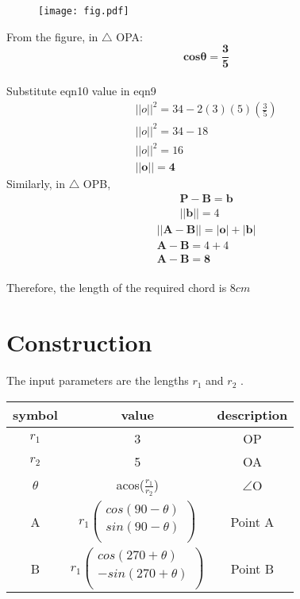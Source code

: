 \documentclass[journal,10pt,twocolumn]{article}
\begin{document}
\begin{figure}[h]
\texttt{[image: fig.pdf]}
\end{figure}
 From the figure, in $\triangle$ OPA:
\begin{equation}
\boldsymbol{cos\theta} = \boldsymbol{\frac{3}{5}}
\end{equation}
\\ Substitute eqn10 value in eqn9
\begin{eqnarray}
||o||^2 = 34 - 2(3)(5)(\frac{3}{5})
\\ ||o||^2 = 34-18
\\ ||o||^2 = 16
\\ \boldsymbol{||o||} =\boldsymbol{4}
\end{eqnarray}
Similarly, in $\triangle$ OPB,
\begin{eqnarray}
	\boldsymbol{P}-\boldsymbol{B} = \boldsymbol{b}
\\	||\boldsymbol{b}|| = 4
\end{eqnarray}
\begin{eqnarray}
	||\boldsymbol{A-B}|| =|\boldsymbol{o}|+|\boldsymbol{b}|
	\\ \boldsymbol{A-B} = 4+4
	\\ \boldsymbol{A-B} = \boldsymbol{8}
\end{eqnarray}
\\ Therefore, the length of the required chord is $8cm$

\section*{Construction}
The input parameters are the lengths $r_1$ and $r_2$ .\\
\setlength \extrarowheight{2pt}
\centering
	\begin{tabular}{|c|c|c|}
	\hline
	\textbf{symbol}&\textbf{value}&\textbf{description}\\
	\hline
	$r_1$&3&OP\\
	\hline
	$r_2$&5&OA\\
	\hline
		$\theta$&acos($\frac{r_1}{r_2}$)&$\angle$O\\
	\hline
	A&$r_1%
	\begin{pmatrix}
		cos(90 -\theta)\\
		sin(90 -\theta)\\
	\end{pmatrix}$%
	&Point A\\
		\hline
	B&$r_1%
		\begin{pmatrix}
			cos(270+\theta)\\
			-sin(270+\theta)\\
		\end{pmatrix}$%
		&Point B\\
	\hline
\end{tabular}
\end{document}

